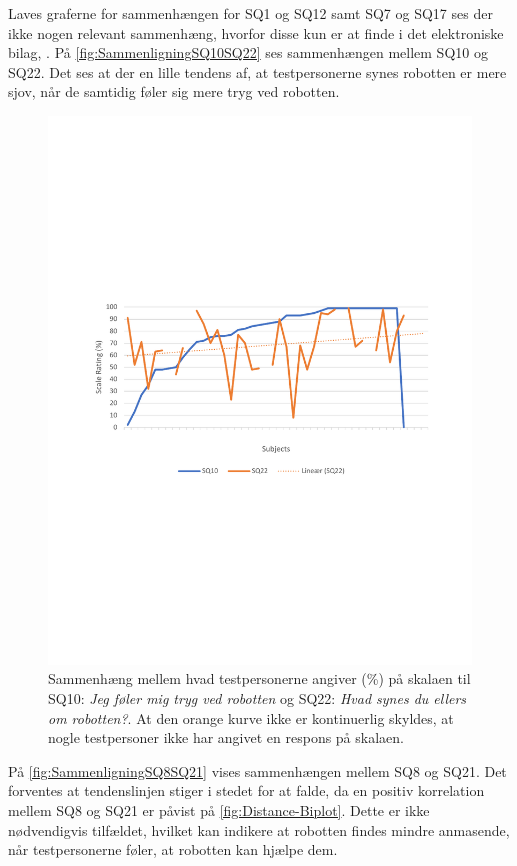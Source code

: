 Laves graferne for sammenhængen for SQ1 og SQ12 samt SQ7 og SQ17 ses der ikke nogen relevant sammenhæng, hvorfor disse kun er at finde i det elektroniske bilag, .
På \autoref{fig:SammenligningSQ10SQ22} ses sammenhængen mellem SQ10 og SQ22. Det ses at der en lille tendens af, at testpersonerne synes robotten er mere sjov, når de samtidig føler sig mere tryg ved robotten.
%
\begin{figure}[H]
	\centering
	\includegraphics[width=\textwidth]{Figure/Korrelationsgrafer/SQ10+SQ22}
	\caption{Sammenhæng mellem hvad testpersonerne angiver (\%) på skalaen til SQ10: \textit{Jeg føler mig tryg ved robotten} og SQ22: \textit{Hvad synes du ellers om robotten?}. At den orange kurve ikke er kontinuerlig skyldes, at nogle testpersoner ikke har angivet en respons på skalaen.}
	\label{fig:SammenligningSQ10SQ22}
\end{figure}
\noindent
%
På \autoref{fig:SammenligningSQ8SQ21} vises sammenhængen mellem SQ8 og SQ21. Det forventes at tendenslinjen stiger i stedet for at falde, da en positiv korrelation mellem SQ8 og SQ21 er påvist på \autoref{fig:Distance-Biplot}. Dette er ikke nødvendigvis tilfældet, hvilket kan indikere at robotten findes mindre anmasende, når testpersonerne føler, at robotten kan hjælpe dem. 
